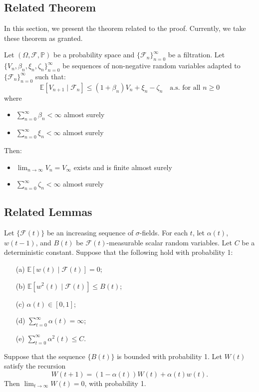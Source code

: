 \subsection{Related Theorem}
In this section, we present the theorem related to the proof. Currently, we take these theorem as granted. 
\begin{theorem}\label{thm:robbins siegmund}
Let $(\Omega, \mathcal{F}, \mathbb{P})$ be a probability space and $\{\mathcal{F}_n\}_{n=0}^{\infty}$ be a filtration. Let $\{V_n,\beta_n, \xi_n, \zeta_n\}_{n=0}^\infty$ be sequences of non-negative random variables adapted to $\{\mathcal{F}_n\}_{n=0}^{\infty}$ such that:
$$
\mathbb{E}[V_{n+1} \mid \mathcal{F}_n] \leq (1+\beta_n)V_n+\xi_n-\zeta_n\quad \text{a.s. for all } n \geq 0
$$
where
\begin{itemize}
    \item $\sum_{n=0}^\infty \beta_n<\infty$ almost surely
    \item $\sum_{n=0}^\infty \xi_n<\infty$ almost surely
\end{itemize}
Then:
\begin{itemize}
    \item $\lim_{n\to\infty}V_n = V_\infty$ exists and is finite almost surely
    \item $\sum_{n=0}^\infty \zeta_n<\infty$ almost surely
\end{itemize}
\end{theorem}

\subsection{Related Lemmas}

\begin{lemma}\label{lm:1}
Let $\{\mathcal{F}(t)\}$ be an increasing sequence of $\sigma$-fields. For each $t$, let $\alpha(t)$, $w(t-1)$, and $B(t)$ be $\mathcal{F}(t)$-measurable scalar random variables. Let $C$ be a deterministic constant. Suppose that the following hold with probability 1:
\begin{enumerate}
\item[(a)] $\mathbb{E}[w(t) \mid \mathcal{F}(t)] = 0$;
\item[(b)] $\mathbb{E}[w^2(t) \mid \mathcal{F}(t)] \leq B(t)$;
\item[(c)] $\alpha(t) \in [0,1]$;
\item[(d)] $\sum_{t=0}^{\infty} \alpha(t) = \infty$;
\item[(e)] $\sum_{t=0}^{\infty} \alpha^2(t) \leq C$.
\end{enumerate}
Suppose that the sequence $\{B(t)\}$ is bounded with probability 1. Let $W(t)$ satisfy the recursion
\begin{equation}
W(t+1) = (1 - \alpha(t))W(t) + \alpha(t)w(t).
\end{equation}
Then $\lim_{t \to \infty} W(t) = 0$, with probability 1.
\end{lemma}


